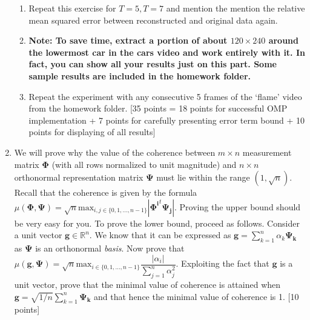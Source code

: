 \documentclass[11pt]{article}
\begin{document}
\begin{enumerate}
\begin{enumerate}
\item Repeat this exercise for $T = 5, T = 7$ and mention the mention the relative mean squared error between reconstructed and original data again.
\item \textbf{Note: To save time, extract a portion of about $120 \times 240$ around the lowermost car in the cars video and work entirely with it. In fact, you can show all your results just on this part. Some sample results are included in the homework folder.}
\item Repeat the experiment with any consecutive 5 frames of the `flame' video from the homework folder. 
\textsf{[35 points = 18 points for successful OMP implementation + 7 points for carefully presenting error term bound + 10 points for displaying of all results]}
\end{enumerate}

\item We will prove why the value of the coherence between $m \times n$ measurement matrix $\boldsymbol{\Phi}$ (with all rows normalized to unit magnitude) and $n \times n$ orthonormal representation matrix $\boldsymbol{\Psi}$ must lie within the range $(1,\sqrt{n})$. Recall that the coherence is given by the formula
$\mu(\boldsymbol{\Phi},\boldsymbol{\Psi}) = \sqrt{n} \textrm{max}_{i,j \in \{0,1,...,n-1\}} |\boldsymbol{\Phi^i}^t \boldsymbol{\Psi_j}|$. 
Proving the upper bound should be very easy for you. To prove the lower bound, proceed as follows. Consider a unit vector $\boldsymbol{g} \in \mathbb{R}^n$. We know that it can be expressed as $\boldsymbol{g} = \sum_{k=1}^n \alpha_k \boldsymbol{\Psi_k}$ as $\boldsymbol{\Psi}$ is an orthonormal \emph{basis}. Now prove that $\mu(\boldsymbol{g},\boldsymbol{\Psi}) = \sqrt{n} \textrm{max}_{i \in \{0,1,...,n-1\}} \dfrac{|\alpha_i|}{\sum_{j=1}^n \alpha^2_j}$. Exploiting the fact that $\boldsymbol{g}$ is a unit vector, prove that the minimal value of coherence is attained when $\boldsymbol{g} = \sqrt{1/n} \sum_{k=1}^n \boldsymbol{\Psi_k}$ and that hence the minimal value of coherence is 1. \textsf{[10 points]}


\end{enumerate}
\end{document}
